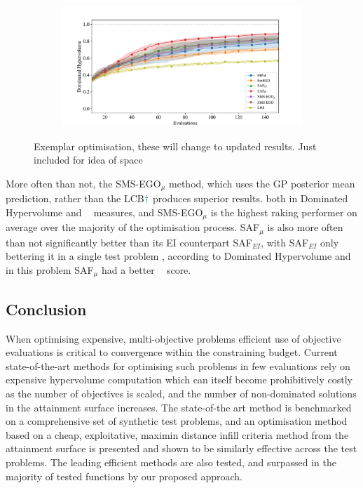 \documentclass[conference]{IEEEtran}
\DeclareMathOperator*{\igdp}{IGD^{+}}
\newcommand\hpv{Dominated Hypervolume\xspace}
\newcommand\safmu{SAF$_{\mu}$\xspace}
\newcommand\safei{SAF$_{EI}$\xspace}
\newcommand\smsegomu{SMS-EGO$_{\mu}$\xspace}
\newcommand\ei{EI\xspace}
\newcommand\gp{GP\xspace}
\newcommand\maximin{maximin\xspace}
\newcommand{\fnote}[2][\textcolor{teal}{\dagger}]{$#1$\marginpar{\color{teal}\raggedright\tiny$#1$
    #2}}
\begin{document}
\begin{figure}[t]
\begin{subfigure}[b]{0.45\columnwidth}
         \caption{}
         \label{fig: exemplar_pf_safmu_saf}
     \end{subfigure}
\begin{subfigure}[b]{\columnwidth}
         \centering
         \includegraphics[width=\columnwidth]{figures/wfg6_3obj_6dim_hv_plot.pdf}
         \caption{}
         \label{fig: exemplar_pf_sms_saf_hv}
     \end{subfigure}
\caption{Exemplar optimisation, these will change to updated results. Just included for idea of space}
\label{fig: exemplar_pf}
\end{figure}

More often than not, the \smsegomu method, which uses the \gp posterior mean prediction, rather than the LCB\fnote{needs defining in \ref{section:related_work}} produces superior results. both in \hpv and $\igdp$ measures, and \smsegomu is the highest raking performer on average over the majority of the optimisation process. \safmu is also more often than not significantly better than its \ei counterpart \safei, with \safei only bettering it in a single test problem , according to \hpv and in this problem \safmu had a better $\igdp$ score.  


\subsection{Conclusion}
When optimising expensive, multi-objective problems efficient use of objective evaluations is critical to convergence within the constraining budget. Current state-of-the-art methods for optimising such problems in few evaluations rely on expensive hypervolume computation which can itself become prohibitively costly as the number of objectives is scaled, and the number of non-dominated solutions in the attainment surface increases. The state-of-the art method is benchmarked on a comprehensive set of synthetic test problems, and an optimisation method based on a cheap, exploitative, \maximin distance infill criteria method from the attainment surface is presented and shown to be similarly effective across the test problems. The leading efficient methods are also tested, and surpassed in the majority of tested functions by our proposed approach. 
\end{document}

